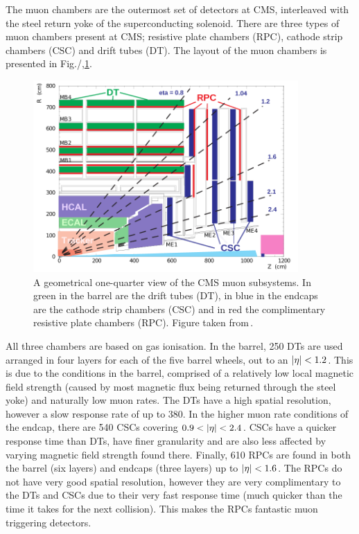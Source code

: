 The muon chambers are the outermost set of detectors at CMS, interleaved with the steel return yoke of the superconducting solenoid.
There are three types of muon chambers present at CMS; resistive plate chambers (RPC), cathode strip chambers (CSC) and drift tubes (DT).
The layout of the muon chambers is presented in Fig./,\ref{fig:CMSMuon}.
\begin{figure}[htpb]
	\centering
	\includegraphics[width=0.9\textwidth]{Figures/CMSMUON}
	\caption[A geometrical one-quarter view of the CMS muon subsystems. In green in the barrel are the drift tubes (DT), in blue in the endcaps are the cathode strip chambers (CSC) and in red the complimentary resistive plate chambers (RPC).]{A geometrical one-quarter view of the CMS muon subsystems. In green in the barrel are the drift tubes (DT), in blue in the endcaps are the cathode strip chambers (CSC) and in red the complimentary resistive plate chambers (RPC). Figure taken from\,\cite{CMSMuon7TeV}.}
	\label{fig:CMSMuon}
\end{figure}
All three chambers are based on gas ionisation.
In the barrel, 250 DTs are used arranged in four layers for each of the five barrel wheels, out to an $\lvert \eta \rvert<1.2$.
This is due to the conditions in the barrel, comprised of a relatively low local magnetic field strength (caused by most magnetic flux being returned through the steel yoke) and naturally low muon rates.
The DTs have a high spatial resolution, however a slow response rate of up to 380\ns{}.
In the higher muon rate conditions of the endcap, there are 540 CSCs covering $0.9<\lvert \eta \rvert<2.4$. 
CSCs have a quicker response time than DTs, have finer granularity and are also less affected by varying magnetic field strength found there.
Finally, 610 RPCs are found in both the barrel (six layers) and endcaps (three layers) up to $\lvert \eta \rvert<1.6$.
The RPCs do not have very good spatial resolution, however they are very complimentary to the DTs and CSCs due to their very fast response time (much quicker than the time it takes for the next collision).
This makes the RPCs fantastic muon triggering detectors.

